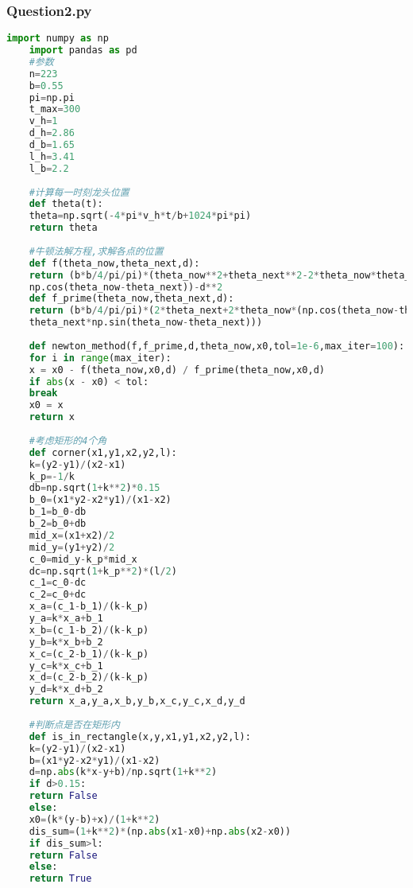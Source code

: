 \documentclass[withoutpreface,bwprint]{cumcmthesis} %
\begin{document}
	\subsubsection*{Question2.py}
	\begin{lstlisting}[language=Python]
	import numpy as np
	import pandas as pd
	#参数
	n=223
	b=0.55
	pi=np.pi
	t_max=300
	v_h=1
	d_h=2.86
	d_b=1.65
	l_h=3.41
	l_b=2.2
	
	#计算每一时刻龙头位置
	def theta(t):
	theta=np.sqrt(-4*pi*v_h*t/b+1024*pi*pi)
	return theta
	
	#牛顿法解方程,求解各点的位置
	def f(theta_now,theta_next,d):
	return (b*b/4/pi/pi)*(theta_now**2+theta_next**2-2*theta_now*theta_next*
	np.cos(theta_now-theta_next))-d**2
	def f_prime(theta_now,theta_next,d):
	return (b*b/4/pi/pi)*(2*theta_next+2*theta_now*(np.cos(theta_now-theta_next)-
	theta_next*np.sin(theta_now-theta_next)))
	
	def newton_method(f,f_prime,d,theta_now,x0,tol=1e-6,max_iter=100):
	for i in range(max_iter):
	x = x0 - f(theta_now,x0,d) / f_prime(theta_now,x0,d)
	if abs(x - x0) < tol:
	break
	x0 = x
	return x
	
	#考虑矩形的4个角
	def corner(x1,y1,x2,y2,l):
	k=(y2-y1)/(x2-x1)
	k_p=-1/k
	db=np.sqrt(1+k**2)*0.15
	b_0=(x1*y2-x2*y1)/(x1-x2)
	b_1=b_0-db
	b_2=b_0+db
	mid_x=(x1+x2)/2
	mid_y=(y1+y2)/2
	c_0=mid_y-k_p*mid_x
	dc=np.sqrt(1+k_p**2)*(l/2)
	c_1=c_0-dc
	c_2=c_0+dc
	x_a=(c_1-b_1)/(k-k_p)
	y_a=k*x_a+b_1
	x_b=(c_1-b_2)/(k-k_p)
	y_b=k*x_b+b_2
	x_c=(c_2-b_1)/(k-k_p)
	y_c=k*x_c+b_1
	x_d=(c_2-b_2)/(k-k_p)
	y_d=k*x_d+b_2
	return x_a,y_a,x_b,y_b,x_c,y_c,x_d,y_d
	
	#判断点是否在矩形内
	def is_in_rectangle(x,y,x1,y1,x2,y2,l):
	k=(y2-y1)/(x2-x1)
	b=(x1*y2-x2*y1)/(x1-x2)
	d=np.abs(k*x-y+b)/np.sqrt(1+k**2)
	if d>0.15:
	return False
	else:
	x0=(k*(y-b)+x)/(1+k**2)
	dis_sum=(1+k**2)*(np.abs(x1-x0)+np.abs(x2-x0))
	if dis_sum>l:
	return False
	else:
	return True
	

\end{lstlisting}
\end{document}
